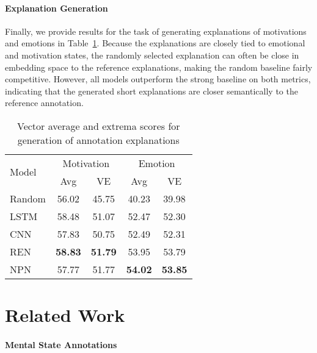 \documentclass[11pt,a4paper]{article}
\begin{document}
\paragraph{Explanation Generation} Finally, we provide results for the task of generating explanations of motivations and emotions in Table~\ref{tab:gen}.  Because the explanations are closely tied to emotional and motivation states, the randomly selected explanation can often be close in embedding space to the reference explanations, making the random baseline fairly competitive.  However, all models outperform the strong baseline on both metrics, indicating that the generated short explanations are closer semantically to the reference annotation. 



\begin{table}[t]
\centering
\begin{tabular}{l  c  c c c}
\toprule
\multirow{2}{*}{Model}          & \multicolumn{2}{c}{Motivation} & \multicolumn{2}{c}{Emotion} \\
& Avg & VE & Avg & VE \\
\midrule
Random    & 56.02     &  45.75  & 40.23    &   39.98        \\
\midrule
LSTM      & 58.48     & 51.07      &  52.47     & 52.30        \\
CNN       & 57.83     & 50.75      & 52.49    & 52.31      \\
REN       & \textbf{58.83}     & \textbf{51.79}      &  53.95    & 53.79       \\
NPN       &  57.77     & 51.77 & \textbf{54.02} &   \textbf{53.85}      \\

\bottomrule
\end{tabular}
\caption{Vector average and extrema scores for generation of annotation explanations}
\label{tab:gen}
\end{table}






%
 \section{Related Work}

\paragraph{Mental State Annotations}
\end{document}
